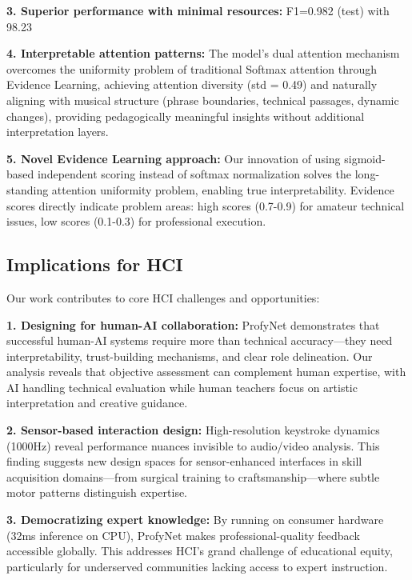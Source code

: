 \documentclass[sigconf,review,anonymous]{acmart}
\begin{document}
\textbf{3. Superior performance with minimal resources:} F1=0.982 (test) with 98.23%

\textbf{4. Interpretable attention patterns:} The model's dual attention mechanism overcomes the uniformity problem of traditional Softmax attention through Evidence Learning, achieving attention diversity (std = 0.49) and naturally aligning with musical structure (phrase boundaries, technical passages, dynamic changes), providing pedagogically meaningful insights without additional interpretation layers.

\textbf{5. Novel Evidence Learning approach:} Our innovation of using sigmoid-based independent scoring instead of softmax normalization solves the long-standing attention uniformity problem, enabling true interpretability. Evidence scores directly indicate problem areas: high scores (0.7-0.9) for amateur technical issues, low scores (0.1-0.3) for professional execution.

\subsection{Implications for HCI}

Our work contributes to core HCI challenges and opportunities:

\textbf{1. Designing for human-AI collaboration:} ProfyNet demonstrates that successful human-AI systems require more than technical accuracy—they need interpretability, trust-building mechanisms, and clear role delineation. Our analysis reveals that objective assessment can complement human expertise, with AI handling technical evaluation while human teachers focus on artistic interpretation and creative guidance.

\textbf{2. Sensor-based interaction design:} High-resolution keystroke dynamics (1000Hz) reveal performance nuances invisible to audio/video analysis. This finding suggests new design spaces for sensor-enhanced interfaces in skill acquisition domains—from surgical training to craftsmanship—where subtle motor patterns distinguish expertise.

\textbf{3. Democratizing expert knowledge:} By running on consumer hardware (32ms inference on CPU), ProfyNet makes professional-quality feedback accessible globally. This addresses HCI's grand challenge of educational equity, particularly for underserved communities lacking access to expert instruction.
\end{document}
